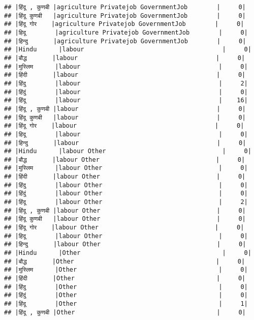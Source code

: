 \documentclass[
]{article}
\begin{document}
\begin{verbatim}
## |हिंदू , कुणबी |agriculture Privatejob GovernmentJob        |     0|
## |हिंदू कुणबी   |agriculture Privatejob GovernmentJob        |     0|
## |हिंदू गोर    |agriculture Privatejob GovernmentJob        |     0|
## |हिदू        |agriculture Privatejob GovernmentJob        |     0|
## |हिन्दु       |agriculture Privatejob GovernmentJob        |     0|
## |Hindu      |labour                                      |     0|
## |बौद्ध       |labour                                      |     0|
## |मुस्लिम      |labour                                      |     0|
## |हिंदी       |labour                                      |     0|
## |हिंदु        |labour                                      |     2|
## |हिंदुं        |labour                                      |     0|
## |हिंदू        |labour                                      |    16|
## |हिंदू , कुणबी |labour                                      |     0|
## |हिंदू कुणबी   |labour                                      |     0|
## |हिंदू गोर    |labour                                      |     0|
## |हिदू        |labour                                      |     0|
## |हिन्दु       |labour                                      |     0|
## |Hindu      |labour Other                                |     0|
## |बौद्ध       |labour Other                                |     0|
## |मुस्लिम      |labour Other                                |     0|
## |हिंदी       |labour Other                                |     0|
## |हिंदु        |labour Other                                |     0|
## |हिंदुं        |labour Other                                |     0|
## |हिंदू        |labour Other                                |     2|
## |हिंदू , कुणबी |labour Other                                |     0|
## |हिंदू कुणबी   |labour Other                                |     0|
## |हिंदू गोर    |labour Other                                |     0|
## |हिदू        |labour Other                                |     0|
## |हिन्दु       |labour Other                                |     0|
## |Hindu      |Other                                       |     0|
## |बौद्ध       |Other                                       |     0|
## |मुस्लिम      |Other                                       |     0|
## |हिंदी       |Other                                       |     0|
## |हिंदु        |Other                                       |     0|
## |हिंदुं        |Other                                       |     0|
## |हिंदू        |Other                                       |     1|
## |हिंदू , कुणबी |Other                                       |     0|

\end{verbatim}
\end{document}
